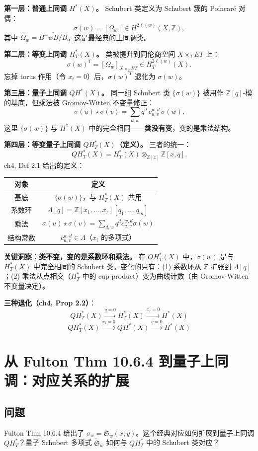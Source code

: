 \textbf{第一层：普通上同调 $H^*(X)$。} Schubert 类定义为 Schubert 簇的 Poincaré 对偶：
$$\sigma(w) = [\Omega_w] \in H^{2\ell(w)}(X, \mathbb{Z}),$$
其中 $\Omega_w = \overline{B^+wB/B}$。这是最经典的上同调类。

\textbf{第二层：等变上同调 $H_T^*(X)$。} 类被提升到同伦商空间 $X \times_T ET$ 上：
$$\sigma(w)^T = [\Omega_w]_{X \times_T ET} \in H_T^{2\ell(w)}(X).$$
忘掉 torus 作用（令 $x_i = 0$）后，$\sigma(w)^T$ 退化为 $\sigma(w)$。

\textbf{第三层：量子上同调 $QH^*(X)$。} 同一组 Schubert 类 $\{\sigma(w)\}$ 被用作 $\mathbb{Z}[q]$-模的基底，但乘法被 Gromov-Witten 不变量修正：
$$\sigma(u) \star \sigma(v) = \sum_{d,w} q^d \, c_{u,v}^{w,d} \, \sigma(w).$$
这里 $\{\sigma(w)\}$ 与 $H^*(X)$ 中的完全相同——\textbf{类没有变}，变的是乘法结构。

\textbf{第四层：等变量子上同调 $QH_T^*(X)$（定义）。} 三者的统一：
$$QH_T^*(X) = H_T^*(X) \otimes_{\mathbb{Z}[x]} \mathbb{Z}[x,q].$$
ch4, Def 2.1 给出的定义：

\begin{tabular}{c|c}
对象 & 定义 \\ \hline
基底 & $\{\sigma(w)\}$，与 $H_T^*(X)$ 共用 \\
系数环 & $\Lambda[q] = \mathbb{Z}[x_1,\ldots,x_r][q_1,\ldots,q_m]$ \\
乘法 & $\sigma(u) \star \sigma(v) = \sum_{d,w} q^d c_{u,v}^{w,d} \sigma(w)$ \\
结构常数 & $c_{u,v}^{w,d} \in \Lambda$（$x_i$ 的多项式） \\
\end{tabular}

\textbf{关键洞察：类不变，变的是系数环和乘法。} 在 $QH_T^*(X)$ 中，$\sigma(w)$ 是与 $H_T^*(X)$ 中完全相同的 Schubert 类。变化的只有：(1) 系数环从 $\mathbb{Z}$ 扩张到 $\Lambda[q]$；(2) 乘法从点相交（$H_T^*$ 中的 cup product）变为曲线计数（由 Gromov-Witten 不变量决定）。

\textbf{三种退化（ch4, Prop 2.2）}：
$$QH_T^*(X) \xrightarrow{q=0} H_T^*(X) \xrightarrow{x_i=0} H^*(X)$$
$$QH_T^*(X) \xrightarrow{x_i=0} QH^*(X) \xrightarrow{q=0} H^*(X)$$

\section{从 Fulton Thm 10.6.4 到量子上同调：对应关系的扩展}
\subsection{问题}
Fulton Thm 10.6.4 给出了 $\sigma_w = \mathfrak{S}_w(x; y)$。这个经典对应如何扩展到量子上同调 $QH_T^*$？量子 Schubert 多项式 $\widetilde{\mathfrak{S}}_w$ 如何与 $QH_T^*$ 中的 Schubert 类对应？
